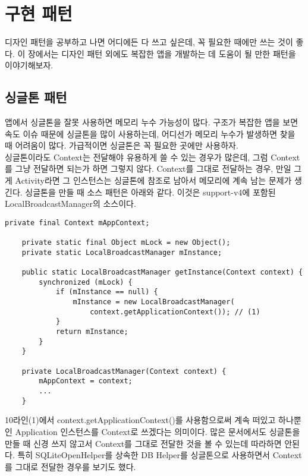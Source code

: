 \chapter{구현 패턴}
디자인 패턴을 공부하고 나면 어디에든 다 쓰고 싶은데, 꼭 필요한 때에만 쓰는 것이 좋다.
이 장에서는 디자인 패턴 외에도 복잡한 앱을 개발하는 데 도움이 될 만한 패턴을 이야기해보자. 

\section{싱글톤 패턴}
\label{sec:singleton}
앱에서 싱글톤을 잘못 사용하면 메모리 누수 가능성이 많다. 
구조가 복잡한 앱을 보면 속도 이슈 때문에 싱글톤을 많이 사용하는데, 어디선가 메모리 누수가 발생하면 찾을 때 어려움이 많다. 
가급적이면 싱글톤은 꼭 필요한 곳에만 사용하자.\\

싱글톤이라도 Context는 전달해야 유용하게 쓸 수 있는 경우가 많은데, 그럼 Context를 그냥 전달하면 되는가 하면 그렇지 않다.
Context를 그대로 전달하는 경우, 만일 그게 Activity라면 그 인스턴스는 싱글톤에 참조로 남아서 메모리에 계속 남는 문제가 생긴다.
싱글톤을 만들 때 소스 패턴은 아래와 같다. 이것은 support-v4에 포함된 LocalBroadcastManager의 소스이다.
\begin{lstlisting}[frame=single, caption=LocalBroadcastManager.java]
    private final Context mAppContext;
	
    private static final Object mLock = new Object();
    private static LocalBroadcastManager mInstance;

    public static LocalBroadcastManager getInstance(Context context) {
        synchronized (mLock) {
            if (mInstance == null) {
                mInstance = new LocalBroadcastManager(
                	context.getApplicationContext()); // (1)
            }
            return mInstance;
        }
    }

    private LocalBroadcastManager(Context context) {
        mAppContext = context;
        ...
    }
\end{lstlisting} 
10라인(1)에서 context.getApplicationContext()를 사용함으로써 계속 떠있고 하나뿐인 Application 인스턴스를 Context로 쓰겠다는 의미이다.
많은 문서에서도 싱글톤을 만들 때 신경 쓰지 않고서 Context를 그대로 전달한 것을 볼 수 있는데 따라하면 안된다.
특히 SQLiteOpenHelper를 상속한 DB Helper를 싱글톤으로 사용하면서 Context를 그대로 전달한 경우를 보기도 했다.\\

